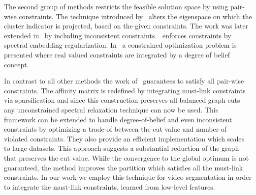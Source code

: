 The second group of methods restricts the feasible solution space by using pair-wise constraints. The technique introduced by~\cite{BieSM04} alters the eigenspace on which the cluster indicator is projected, 
based on the given constraints.
The work was later extended in~\cite{ColemanSW08} by including inconsistent constraints.~\cite{XuLS09} enforces constraints by spectral embedding regularization. In~\cite{WangD10} a constrained optimization problem is presented where
real valued constraints are integrated by a degree of belief concept.

In contrast to all other methods the work of~\cite{RangapuramH12} guarantees to satisfy all pair-wise constraints.  
The affinity matrix is redefined by integrating must-link constraints via sparsification and since this construction
preserves all balanced graph cuts any unconstrained spectral relaxation technique can now be used. This framework can be extended to handle degree-of-belief and even inconsistent constraints by optimizing a trade-of between the cut 
value and number of violated constraints. They also provide an efficient implementation which scales to large datasets. This approach suggests a substantial reduction of the graph that preserves the cut value.
While the convergence to the global optimum is not guaranteed, the method improves the partition which satisfies all the must-link constraints.
In our work we employ this technique for video segmentation in order to integrate the must-link constraints, learned from low-level features. 
